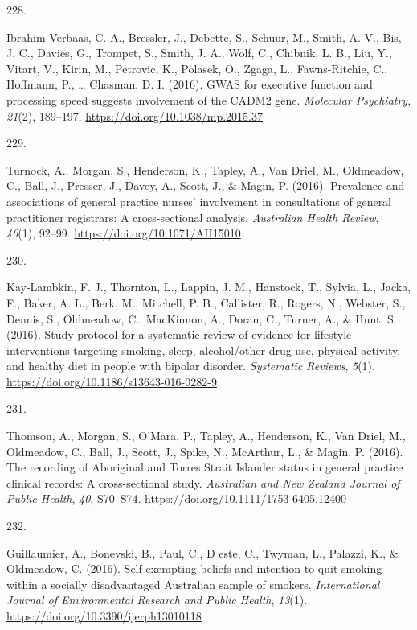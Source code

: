 \documentclass[11pt, a4paper]{awesome-cv}
\newlength{\csllabelwidth}
\newcommand{\CSLLeftMargin}[1]{\parbox[t]{\csllabelwidth}{#1}}
\newcommand{\CSLRightInline}[1]{\parbox[t]{\linewidth - \csllabelwidth}{#1}}
\begin{document}
\leavevmode\hypertarget{ref-ibrahim-verbaas_gwas_2016}{}%
\CSLLeftMargin{228. }
\CSLRightInline{Ibrahim-Verbaas, C. A., Bressler, J., Debette, S.,
Schuur, M., Smith, A. V., Bis, J. C., Davies, G., Trompet, S., Smith, J.
A., Wolf, C., Chibnik, L. B., Liu, Y., Vitart, V., Kirin, M., Petrovic,
K., Polasek, O., Zgaga, L., Fawns-Ritchie, C., Hoffmann, P., \ldots{}
Chasman, D. I. (2016). GWAS for executive function and processing speed
suggests involvement of the CADM2 gene. \emph{Molecular Psychiatry},
\emph{21}(2), 189--197. \url{https://doi.org/10.1038/mp.2015.37}}

\leavevmode\hypertarget{ref-turnock_prevalence_2016}{}%
\CSLLeftMargin{229. }
\CSLRightInline{Turnock, A., Morgan, S., Henderson, K., Tapley, A., Van
Driel, M., Oldmeadow, C., Ball, J., Presser, J., Davey, A., Scott, J.,
\& Magin, P. (2016). Prevalence and associations of general practice
nurses' involvement in consultations of general practitioner registrars:
A cross-sectional analysis. \emph{Australian Health Review},
\emph{40}(1), 92--99. \url{https://doi.org/10.1071/AH15010}}

\leavevmode\hypertarget{ref-kay-lambkin_study_2016}{}%
\CSLLeftMargin{230. }
\CSLRightInline{Kay-Lambkin, F. J., Thornton, L., Lappin, J. M.,
Hanstock, T., Sylvia, L., Jacka, F., Baker, A. L., Berk, M., Mitchell,
P. B., Callister, R., Rogers, N., Webster, S., Dennis, S., Oldmeadow,
C., MacKinnon, A., Doran, C., Turner, A., \& Hunt, S. (2016). Study
protocol for a systematic review of evidence for lifestyle interventions
targeting smoking, sleep, alcohol/other drug use, physical activity, and
healthy diet in people with bipolar disorder. \emph{Systematic Reviews},
\emph{5}(1). \url{https://doi.org/10.1186/s13643-016-0282-9}}

\leavevmode\hypertarget{ref-thomson_recording_2016}{}%
\CSLLeftMargin{231. }
\CSLRightInline{Thomson, A., Morgan, S., O'Mara, P., Tapley, A.,
Henderson, K., Van Driel, M., Oldmeadow, C., Ball, J., Scott, J., Spike,
N., McArthur, L., \& Magin, P. (2016). The recording of Aboriginal and
Torres Strait Islander status in general practice clinical records: A
cross-sectional study. \emph{Australian and New Zealand Journal of
Public Health}, \emph{40}, S70--S74.
\url{https://doi.org/10.1111/1753-6405.12400}}

\leavevmode\hypertarget{ref-guillaumier_self-exempting_2016}{}%
\CSLLeftMargin{232. }
\CSLRightInline{Guillaumier, A., Bonevski, B., Paul, C., D este, C.,
Twyman, L., Palazzi, K., \& Oldmeadow, C. (2016). Self-exempting beliefs
and intention to quit smoking within a socially disadvantaged Australian
sample of smokers. \emph{International Journal of Environmental Research
and Public Health}, \emph{13}(1).
\url{https://doi.org/10.3390/ijerph13010118}}
\end{document}
